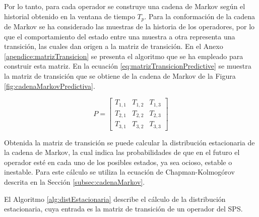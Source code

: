 
Por lo tanto, para cada operador se construye una cadena de Markov según el historial obtenido en la ventana de tiempo $T_p$. Para la conformación de la cadena de Markov se ha considerado las muestras de la historia de los operadores, por lo que el comportamiento del estado entre una muestra a otra representa una transición, las cuales dan origen a la matriz de transición. En el Anexo \ref{apendice:matrizTransicion} se presenta el algoritmo que se ha empleado para construir esta matriz. En la ecuación \ref{eq:matrizTransicionPredictive} se muestra la matriz de transición que se obtiene de la cadena de Markov de la Figura \ref{fig:cadenaMarkovPredictiva}.

\begin{equation} \label{eq:matrizTransicionPredictive}
	P =
	\begin{bmatrix}
		T_{1,1} & T_{1,2} & T_{1,3} \\
		T_{2,1} & T_{2,2} & T_{2,3} \\
		T_{3,1} & T_{3,2} & T_{3,3}
	\end{bmatrix}	
\end{equation}

Obtenida la matriz de transición se puede calcular la distribución estacionaria de la cadena de Markov, la cual indica las probabilidades de que en el futuro el operador esté en cada uno de los posibles estados, ya sea ocioso, estable o inestable. Para este cálculo se utiliza la ecuación de Chapman-Kolmogórov \citep{Papoulis1984} descrita en la Sección \ref{subsec:cadenaMarkov}.

El Algoritmo \ref{alg:distEstacionaria} describe el cálculo de la distribución estacionaria, cuya entrada es la matriz de transición de un operador del SPS. 

